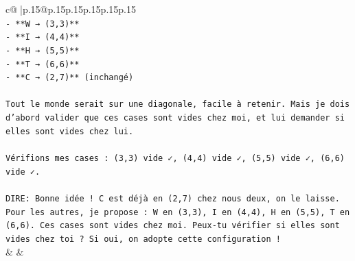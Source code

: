 \documentclass{article}
\begin{document}
{\begin{supertabular}{c@{$\;$}|p{.15\linewidth}@{}p{.15\linewidth}p{.15\linewidth}p{.15\linewidth}p{.15\linewidth}p{.15\linewidth}}
{{{\\ 
\texttt{{-} **W → (3,3)**} \\
\texttt{{-} **I → (4,4)**} \\
\texttt{{-} **H → (5,5)**} \\
\texttt{{-} **T → (6,6)**} \\
\texttt{{-} **C → (2,7)** (inchangé)} \\
\\ 
\texttt{Tout le monde serait sur une diagonale, facile à retenir. Mais je dois d'abord valider que ces cases sont vides chez moi, et lui demander si elles sont vides chez lui.} \\
\\ 
\texttt{Vérifions mes cases : (3,3) vide ✓, (4,4) vide ✓, (5,5) vide ✓, (6,6) vide ✓.} \\
\\ 
\texttt{DIRE: Bonne idée ! C est déjà en (2,7) chez nous deux, on le laisse. Pour les autres, je propose : W en (3,3), I en (4,4), H en (5,5), T en (6,6). Ces cases sont vides chez moi. Peux{-}tu vérifier si elles sont vides chez toi ? Si oui, on adopte cette configuration !} \\
            }
        }
    }
    & & \\ \\


\end{supertabular}}
\end{document}
